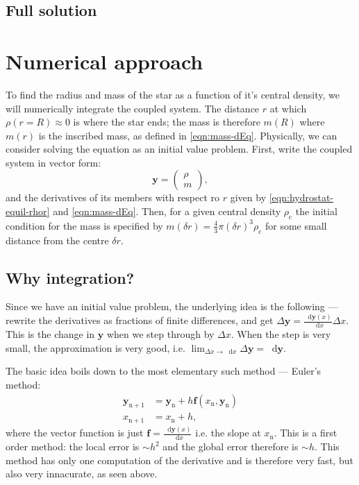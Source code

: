 \documentclass[]{article}
\newcommand{\dd}{\mathop{}\!\mathrm{d}}
\renewcommand{\vec}[1]{\boldsymbol{#1}}
\begin{document}
\subsection{Full solution}


\section{Numerical approach}\label{sec:numerical-approach}
	To find the radius and mass of the star as a function of it's central density, we will numerically integrate the coupled system. The distance $r$ at which $\rho (r=R) \approx 0$ is where the star ends; the mass is therefore $m(R)$ where $m(r)$ is the inscribed mass, as defined in \eqref{eqn:mass-dEq}. Physically, we can consider solving the equation as an initial value problem. First, write the coupled system in vector form:
	\begin{equation}
		\vec{y} = \begin{pmatrix}
			\rho \\
			m
		\end{pmatrix},
	\end{equation}
	and the derivatives of its members with respect ro $r$ given by \eqref{eqn:hydrostat-equil-rhor} and \eqref{eqn:mass-dEq}. Then, for a given central density $\rho_\mathrm{c}$ the initial condition for the mass is specified by $m(\delta r) = \frac{4}{3} \pi (\delta r)^3 \rho_\mathrm{c}$ for some small distance from the centre $\delta r$.
\subsection{Why integration?}
	Since we have an initial value problem, the underlying idea is the following --- rewrite the derivatives as fractions of finite differences, and get $\Delta \vec{y} = \frac{\dd \vec{y}(x)}{\dd x} \Delta x$. This is the change in $\vec{y}$ when we step through by $\Delta x$. When the step is very small, the approximation is very good, i.e. $\lim_{\Delta x \rightarrow \dd x} \Delta \vec{y} = \dd \vec{y}$.

	The basic idea boils down to the most elementary such method --- Euler's method:
	\begin{align}
		\vec{y}_\mathrm{n+1} &= \vec{y}_\mathrm{n} + h \vec{f}(x_\mathrm{n}, \vec{y}_\mathrm{n})\\
		x_\mathrm{n+1} &= x_\mathrm{n} + h, \nonumber
	\end{align}
	where the vector function is just $\vec{f} = \frac{\dd \vec{y}(x)}{\dd x}$ i.e. the slope at $x_\mathrm{n}$. This is a first order method: the local error is $\sim h^2$ and the global error therefore is $\sim h$. This method has only one computation of the derivative and is therefore very fast, but also very innacurate, as seen above.
\end{document}

